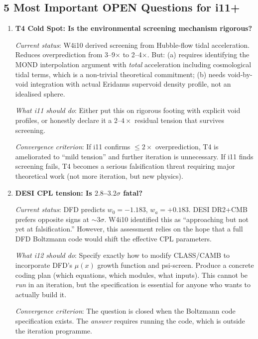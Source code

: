 \documentclass[11pt]{article}
\begin{document}
\subsection{5 Most Important OPEN Questions for i11+}

\begin{tcolorbox}[colback=red!3!white, colframe=red!60!black,
  title=\textbf{TOP 5 OPEN QUESTIONS}]

\begin{enumerate}
\item \textbf{T4 Cold Spot: Is the environmental screening mechanism
  rigorous?}

  \emph{Current status}: W4i10 derived screening from Hubble-flow tidal
  acceleration. Reduces overprediction from 3--9$\times$ to 2--4$\times$.
  But: (a) requires identifying the MOND interpolation argument with
  \emph{total} acceleration including cosmological tidal terms, which is a
  non-trivial theoretical commitment; (b) needs void-by-void integration
  with actual Eridanus supervoid density profile, not an idealised sphere.

  \emph{What i11 should do}: Either put this on rigorous footing with
  explicit void profiles, or honestly declare it a $2$--$4\times$ residual
  tension that survives screening.

  \emph{Convergence criterion}: If i11 confirms $\leq 2\times$
  overprediction, T4 is ameliorated to ``mild tension'' and further
  iteration is unnecessary. If i11 finds screening fails, T4 becomes
  a serious falsification threat requiring major theoretical work
  (not more iteration, but new physics).

\item \textbf{DESI CPL tension: Is $2.8$--$3.2\sigma$ fatal?}

  \emph{Current status}: DFD predicts $w_0 = -1.183$, $w_a = +0.183$.
  DESI DR2+CMB prefers opposite signs at $\sim 3\sigma$. W4i10
  identified this as ``approaching but not yet at falsification.''
  However, this assessment relies on the hope that a full DFD Boltzmann
  code would shift the effective CPL parameters.

  \emph{What i12 should do}: Specify exactly how to modify CLASS/CAMB
  to incorporate DFD's $\mu(x)$ growth function and psi-screen. Produce
  a concrete coding plan (which equations, which modules, what inputs).
  This cannot be \emph{run} in an iteration, but the specification is
  essential for anyone who wants to actually build it.

  \emph{Convergence criterion}: The question is closed when the Boltzmann
  code specification exists. The \emph{answer} requires running the code,
  which is outside the iteration programme.


\end{enumerate}
\end{tcolorbox}
\end{document}
